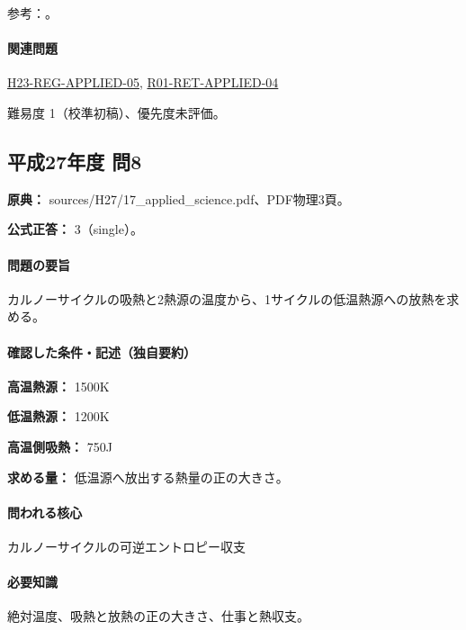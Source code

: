 \par 参考：\cite{mit_thermo_firstlaw2008}。

\paragraph{関連問題} \hyperref[q:h23-reg-applied-05]{H23-REG-APPLIED-05}, \hyperref[q:r01-ret-applied-04]{R01-RET-APPLIED-04}

\par 難易度 1（校準初稿）、優先度未評価。

\subsection{平成27年度 問8}
\label{q:h27-reg-applied-08}

\noindent\textbf{原典：} sources/H27/17\_applied\_science.pdf、PDF物理3頁。

\textbf{公式正答：} 3（single）。

\paragraph{問題の要旨} カルノーサイクルの吸熱と2熱源の温度から、1サイクルの低温熱源への放熱を求める。

\paragraph{確認した条件・記述（独自要約）}\mbox{}\par

\noindent\textbf{高温熱源：} 1500K\par

\noindent\textbf{低温熱源：} 1200K\par

\noindent\textbf{高温側吸熱：} 750J\par

\noindent\textbf{求める量：} 低温源へ放出する熱量の正の大きさ。\par

\paragraph{問われる核心} カルノーサイクルの可逆エントロピー収支

\paragraph{必要知識} 絶対温度、吸熱と放熱の正の大きさ、仕事と熱収支。

